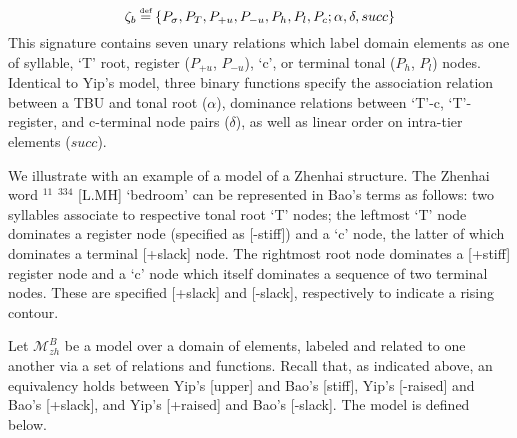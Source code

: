 \documentclass{article}
\newcommand\myeq{\mathrel{\stackrel{\makebox[0pt]{\mbox{\normalfont\tiny def}}}{=}}}
\begin{document}
\begin{equation}
\zeta_{b}\myeq \{P_{\sigma}, P_{T}, P_{+u}, P_{-u}, P_{h}, P_{l}, P_{c}; \alpha, \delta, succ\} \\
\end{equation}
This signature contains seven unary relations which label domain elements as one of syllable, `T' root, register ($P_{+u}$, $P_{-u}$), `c', or terminal tonal ($P_{h}$, $P_{l}$) nodes. Identical to Yip's model, three binary functions specify the association relation between a TBU and tonal root ($\alpha$), dominance relations between `T'-c, `T'-register, and c-terminal node pairs ($\delta$), as well as linear order on intra-tier elements ($succ$). \par
We illustrate with an example of a model of a Zhenhai structure. The Zhenhai word  $^{11}$ $^{334}$ [L.MH] `bedroom' can be represented in Bao's terms as follows: two syllables associate to respective tonal root `T' nodes; the leftmost `T' node dominates a register node (specified as [-stiff]) and a `c' node, the latter of which dominates a terminal [+slack] node. The rightmost root node dominates a [+stiff] register node and a `c' node which itself dominates a sequence of two terminal nodes. These are specified [+slack] and [-slack], respectively to indicate a rising contour.
\begin{center}
\hspace{1em}
\end{center}
Let $\mathcal{M}^{B}_{zh}$ be a model over a domain of elements, labeled and related to one another via a set of relations and functions. Recall that, as indicated above, an equivalency holds between Yip's [upper] and Bao's [stiff], Yip's [-raised] and Bao's [+slack], and Yip's [+raised] and Bao's [-slack]. The model is defined below.
\end{document}
